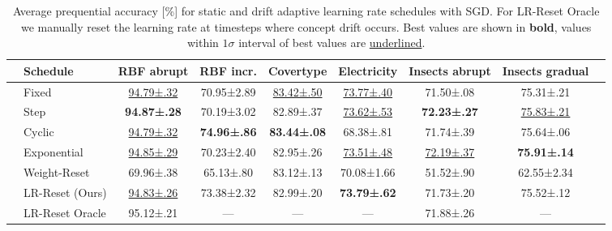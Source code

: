 \documentclass[runningheads]{llncs}
\begin{document}
\begin{table}[ht]
	\centering
	\scriptsize
	\caption{Average prequential accuracy [\%] for static and drift adaptive learning rate schedules with SGD. For LR-Reset Oracle we manually reset the learning rate at timesteps where concept drift occurs. Best values are shown in \textbf{bold}, values within $1\sigma$ interval of best values are \underline{underlined}.}
	\begin{tabular}{llccccccc}
		\toprule
		                                                    & Schedule                                         & RBF abrupt            & RBF incr.           & Covertype             & Electricity           & Insects abrupt        & Insects gradual       \\
		\midrule
		\multirow{4}{*}{\rotatebox[origin=c]{90}{Static}}   & Fixed                                            & \underline{94.79±.32} & 70.95±2.89          & \underline{83.42±.50} & \underline{73.77±.40} & 71.50±.08             & 75.31±.21             \\
		                                                    & Step                                             & \bfseries 94.87±.28   & 70.19±3.02          & 82.89±.37             & \underline{73.62±.53} & \bfseries 72.23±.27   & \underline{75.83±.21} \\
		                                                    & Cyclic                                           & \underline{94.79±.32} & \bfseries 74.96±.86 & \bfseries 83.44±.08   & 68.38±.81             & 71.74±.39             & 75.64±.06             \\
		                                                    & Exponential                                      & \underline{94.85±.29} & 70.23±2.40          & 82.95±.26             & \underline{73.51±.48} & \underline{72.19±.37} & \bfseries 75.91±.14   \\ \midrule
		\multirow{3}{*}{\rotatebox[origin=c]{90}{Adapt.}} & Weight-Reset                                     & 69.96±.38             & 65.13±.80           & 83.12±.13             & 70.08±1.66            & 51.52±.90             & 62.55±2.34            \\
		                                                    & LR-Reset (Ours)                                  & \underline{94.83±.26} & 73.38±2.32          & 82.99±.20             & \bfseries 73.79±.62   & 71.73±.20             & 75.52±.12             \\
		                                                    & LR-Reset Oracle                                  & 95.12±.21             & ---                 & ---                   & ---                   & 71.88±.26             & ---                   \\
		\bottomrule
	\end{tabular}
	\label{tab:lr_resetting}
\end{table}
\end{document}

